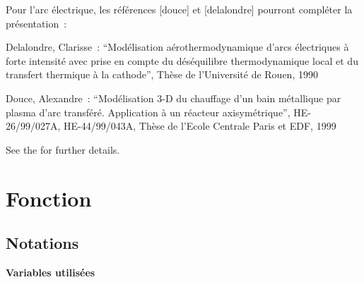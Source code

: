Pour l'arc électrique,
les références [douce] et [delalondre] pourront compléter la
présentation~:

\noindent{\bf [delalondre] }Delalondre, Clarisse~: ``Modélisation aérothermodynamique d'arcs
électriques à forte intensité avec prise en compte du déséquilibre
thermodynamique local et du transfert thermique à la cathode'', Thèse de
l'Université de Rouen, 1990

\noindent{\bf [douce]} Douce, Alexandre~: ``Modélisation 3-D du chauffage d'un
bain métallique par plasma d'arc transféré. Application à un réacteur
axisymétrique'', HE-26/99/027A, HE-44/99/043A, Thèse de l'Ecole Centrale
Paris et EDF, 1999

See the  for further details.

\section*{Fonction}

\subsection*{Notations}

{\bf Variables utilisées}
\nopagebreak

